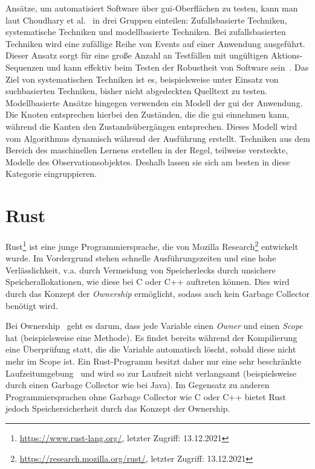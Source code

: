 Ansätze, um automatisiert Software über \gls{gui}-Oberflächen zu testen, kann man laut Choudhary et al.~\cite{choudharyAutomatedTestInput2015a} in drei Gruppen einteilen: Zufallsbasierte Techniken, systematische Techniken und modellbasierte Techniken.
Bei zufallsbasierten Techniken wird eine zufällige Reihe von Events auf einer Anwendung ausgeführt. Dieser Ansatz sorgt für eine große Anzahl an Testfällen mit ungültigen Aktions-Sequenzen und kann effektiv beim Testen der Robustheit von Software sein~\cite{pezzeAutomaticGUITesting2018}.
Das Ziel von systematischen Techniken ist es, beispielsweise unter Einsatz von suchbasierten Techniken, bisher nicht abgedeckten Quelltext zu testen.
Modellbasierte Ansätze hingegen verwenden ein Modell der \gls{gui} der Anwendung. Die Knoten entsprechen hierbei den Zuständen, die die \gls{gui} einnehmen kann, während die Kanten den Zustandsübergängen entsprechen. Dieses Modell wird vom Algorithmus dynamisch während der Ausführung erstellt. Techniken aus dem Bereich des maschinellen Lernens erstellen in der Regel, teilweise versteckte, Modelle des Observationsobjektes. Deshalb lassen sie sich am besten in diese Kategorie eingruppieren.

\section{Rust}
\label{sec:rust}
Rust\footnote{\url{https://www.rust-lang.org/}, letzter Zugriff: 13.12.2021} ist eine junge Programmiersprache, die von Mozilla Research\footnote{\url{https://research.mozilla.org/rust/}, letzter Zugriff: 13.12.2021} entwickelt wurde. Im Vordergrund stehen schnelle Ausführungszeiten und eine hohe Verlässlichkeit, v.a. durch Vermeidung von Speicherlecks durch unsichere Speicherallokationen, wie diese bei C oder C++ auftreten können. Dies wird durch das Konzept der \emph{Ownership} ermöglicht, sodass auch kein Garbage Collector benötigt wird.

Bei Ownership~\cite{WhatOwnershipRust} geht es darum, dass jede Variable einen \emph{Owner} und einen \emph{Scope} hat (beispielsweise eine Methode). Es findet bereits während der Kompilierung eine Überprüfung statt, die die Variable automatisch löscht, sobald diese nicht mehr im Scope ist. Ein Rust-Programm besitzt daher nur eine sehr beschränkte Laufzeitumgebung~\cite{RustRuntimeRust} und wird so zur Laufzeit nicht verlangsamt (beispielsweise durch einen Garbage Collector wie bei Java). Im Gegensatz zu anderen Programmiersprachen ohne Garbage Collector wie C oder C++ bietet Rust jedoch Speichersicherheit durch das Konzept der Ownership.

